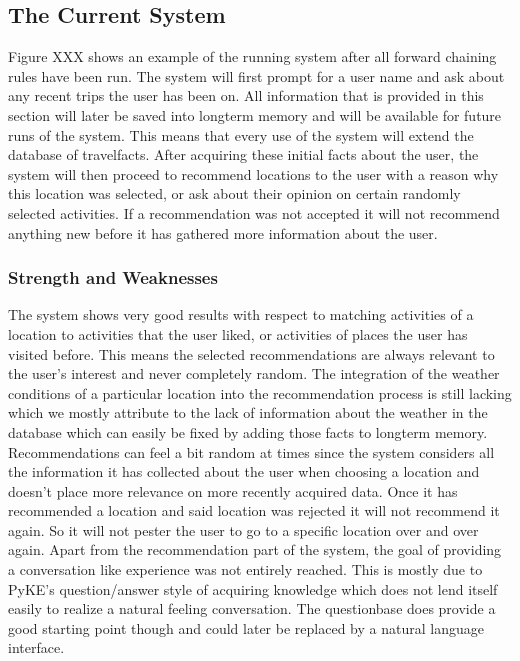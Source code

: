 \documentclass[11pt]{article} %
\begin{document}
\subsection{The Current System}
Figure XXX shows an example of the running system after all forward chaining rules have been run. The system will first prompt for a user name and ask about any recent trips the user has been on. All information that is provided in this section will later be saved into longterm memory and will be available for future runs of the system. This means that every use of the system will extend the database of travelfacts.
After acquiring these initial facts about the user, the system will then proceed to recommend locations to the user with a reason why this location was selected, or ask about their opinion on certain randomly selected activities. If a recommendation was not accepted it will not recommend anything new before it has gathered more information about the user.

\subsubsection{Strength and Weaknesses}
The system shows very good results with respect to matching activities of a location to activities that the user liked, or activities of places the user has visited before. This means the selected recommendations are always relevant to the user's interest and never completely random.
The integration of the weather conditions of a particular location into the recommendation process is still lacking which we mostly attribute to the lack of information about the weather in the database which can easily be fixed by adding those facts to longterm memory.
Recommendations can feel a bit random at times since the system considers all the information it has collected about the user when choosing a location and doesn't place more relevance on more recently acquired data.
Once it has recommended a location and said location was rejected it will not recommend it again. So it will not pester the user to go to a specific location over and over again.
Apart from the recommendation part of the system, the goal of providing a conversation like experience was not entirely reached. This is mostly due to PyKE's question/answer style of acquiring knowledge which does not lend itself easily to realize a natural feeling conversation. The questionbase does provide a good starting point though and could later be replaced by a natural language interface.
\end{document}
